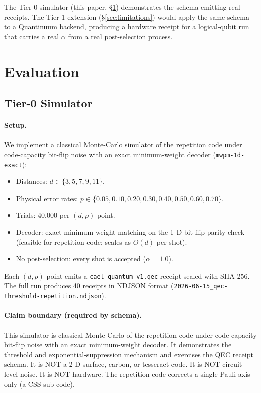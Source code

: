 \documentclass[conference]{IEEEtran}
\newcommand{\af}{\alpha}            %
\begin{document}
The Tier-0 simulator (this paper, \S\ref{sec:evaluation}) demonstrates
the schema emitting real receipts. The Tier-1 extension
(\S\ref{sec:limitations}) would apply the same schema to a Quantinuum
backend, producing a hardware receipt for a logical-qubit run that
carries a real $\af$ from a real post-selection process.

\section{Evaluation}
\label{sec:evaluation}

\subsection{Tier-0 Simulator}

\paragraph{Setup.}
We implement a classical Monte-Carlo simulator of the repetition code
under code-capacity bit-flip noise with an exact minimum-weight decoder
(\texttt{mwpm-1d-exact}):
\begin{itemize}
  \item Distances: $d \in \{3, 5, 7, 9, 11\}$.
  \item Physical error rates: $p \in \{0.05, 0.10, 0.20, 0.30, 0.40, 0.50, 0.60, 0.70\}$.
  \item Trials: 40,000 per $(d, p)$ point.
  \item Decoder: exact minimum-weight matching on the 1-D bit-flip parity
    check (feasible for repetition code; scales as $O(d)$ per shot).
  \item No post-selection: every shot is accepted ($\af = 1.0$).
\end{itemize}

Each $(d, p)$ point emits a \texttt{cael-quantum-v1.qec} receipt sealed
with SHA-256. The full run produces 40 receipts in NDJSON format
(\texttt{2026-06-15\_qec-threshold-repetition.ndjson}).

\paragraph{Claim boundary (required by schema).}
This simulator is classical Monte-Carlo of the repetition code under
code-capacity bit-flip noise with an exact minimum-weight decoder. It
demonstrates the threshold and exponential-suppression mechanism and
exercises the QEC receipt schema. It is NOT a 2-D surface, carbon, or
tesseract code. It is NOT circuit-level noise. It is NOT hardware.
The repetition code corrects a single Pauli axis only (a CSS sub-code).
\end{document}
